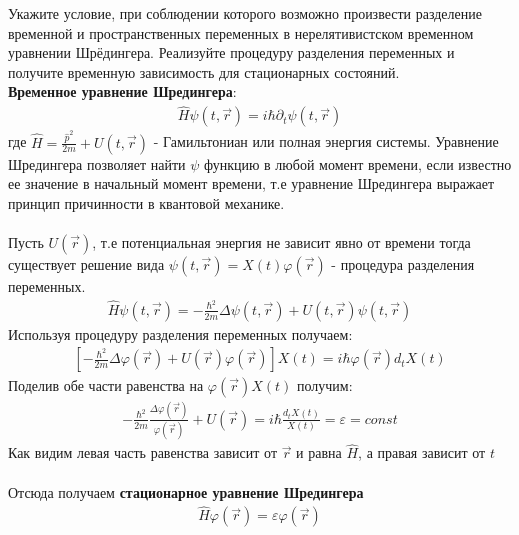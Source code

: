 \documentclass[__main__.tex]{subfiles}
\begin{document}
Укажите условие, при соблюдении которого возможно произвести разделение временной и пространственных переменных в нерелятивистском временном уравнении Шрёдингера. Реализуйте процедуру разделения переменных и получите временную зависимость для стационарных состояний.\\

\textbf{Временное уравнение Шредингера}:
\begin{gather*}
    \hat{H}\psi(t,\vec{r}) = i\hbar \partial_{t}\psi(t,\vec{r})
\end{gather*}
где $\hat{H} = \frac{\hat{p}^2}{2m}+U(t,\vec{r})$ - Гамильтониан или полная энергия системы.
Уравнение Шредингера позволяет найти $\psi$ функцию в любой момент времени, если известно ее значение в начальный момент времени, т.е уравнение Шредингера выражает принцип причинности в квантовой механике.\\\\
Пусть $U(\vec{r})$, т.е потенциальная энергия не зависит явно от времени тогда существует решение вида $\psi(t,\vec{r})=X(t)\varphi(\vec{r})$ - процедура разделения переменных.
\begin{gather*}
    \hat{H}\psi(t,\vec{r})=-\frac{\hbar^2}{2m}\Delta\psi(t,\vec{r})+U(t,\vec{r})\psi(t,\vec{r})
\end{gather*}
Используя процедуру разделения переменных получаем:
\begin{gather*}
    \left[
    -\frac{\hbar^2}{2m}\Delta\varphi(\vec{r})+U(\vec{r})\varphi(\vec{r})
    \right]X(t)
    =
    i\hbar \varphi(\vec{r}) d_{t}X(t)
\end{gather*}
Поделив обе части равенства на $\varphi(\vec{r})X(t)$ получим:
\begin{gather*}
    -\frac{\hbar^2}{2m}\frac{\Delta\varphi(\vec{r})}{\varphi(\vec{r})}+U(\vec{r})
    =
    i\hbar\frac{d_{t}X(t)}{X(t)}
    =
    \varepsilon=const
\end{gather*}
Как видим левая часть равенства зависит от $\vec{r}$ и равна $\hat{H}$, а правая зависит от $t$\\\\
Отсюда получаем \textbf{стационарное уравнение Шредингера}
\begin{gather*}
    \hat{H}\varphi(\vec{r}) = \varepsilon\varphi(\vec{r})
\end{gather*}
\end{document}
